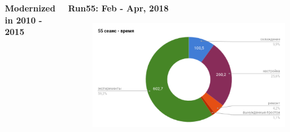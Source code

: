 \documentclass[dvipsnames] {beamer}
\begin{document}
\begin{frame}
\begin{columns}[t]
\begin{block}{\bf \centering Modernized in 2010 - 2015}
{      }
    \end{block}
    \begin{block}{\bf \centering Run55: Feb - Apr, 2018}
      \begin{figure}[H]
        \includegraphics[width=1.\linewidth]{run55.png} \\
      \end{figure}
    \end{block}


\end{columns}
\end{frame}
\end{document}
